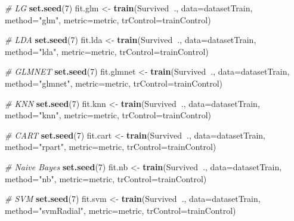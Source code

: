 \documentclass[]{article}
\newenvironment{Shaded}{\begin{snugshade}}{\end{snugshade}}
\newcommand{\KeywordTok}[1]{\textcolor[rgb]{0.13,0.29,0.53}{\textbf{#1}}}
\newcommand{\DataTypeTok}[1]{\textcolor[rgb]{0.13,0.29,0.53}{#1}}
\newcommand{\DecValTok}[1]{\textcolor[rgb]{0.00,0.00,0.81}{#1}}
\newcommand{\StringTok}[1]{\textcolor[rgb]{0.31,0.60,0.02}{#1}}
\newcommand{\CommentTok}[1]{\textcolor[rgb]{0.56,0.35,0.01}{\textit{#1}}}
\newcommand{\OperatorTok}[1]{\textcolor[rgb]{0.81,0.36,0.00}{\textbf{#1}}}
\newcommand{\NormalTok}[1]{#1}
\begin{document}
\begin{Shaded}
\begin{Highlighting}[]
\CommentTok{# LG}
\KeywordTok{set.seed}\NormalTok{(}\DecValTok{7}\NormalTok{)}
\NormalTok{fit.glm <-}\StringTok{ }\KeywordTok{train}\NormalTok{(Survived}\OperatorTok{~}\NormalTok{., }\DataTypeTok{data=}\NormalTok{datasetTrain, }\DataTypeTok{method=}\StringTok{"glm"}\NormalTok{, }\DataTypeTok{metric=}\NormalTok{metric, }
                 \DataTypeTok{trControl=}\NormalTok{trainControl)}

\CommentTok{# LDA}
\KeywordTok{set.seed}\NormalTok{(}\DecValTok{7}\NormalTok{)}
\NormalTok{fit.lda <-}\StringTok{ }\KeywordTok{train}\NormalTok{(Survived}\OperatorTok{~}\NormalTok{., }\DataTypeTok{data=}\NormalTok{datasetTrain, }\DataTypeTok{method=}\StringTok{"lda"}\NormalTok{, }\DataTypeTok{metric=}\NormalTok{metric, }
                 \DataTypeTok{trControl=}\NormalTok{trainControl)}

\CommentTok{# GLMNET}
\KeywordTok{set.seed}\NormalTok{(}\DecValTok{7}\NormalTok{)}
\NormalTok{fit.glmnet <-}\StringTok{ }\KeywordTok{train}\NormalTok{(Survived}\OperatorTok{~}\NormalTok{., }\DataTypeTok{data=}\NormalTok{datasetTrain, }\DataTypeTok{method=}\StringTok{"glmnet"}\NormalTok{, }\DataTypeTok{metric=}\NormalTok{metric,}
                    \DataTypeTok{trControl=}\NormalTok{trainControl)}

\CommentTok{# KNN}
\KeywordTok{set.seed}\NormalTok{(}\DecValTok{7}\NormalTok{)}
\NormalTok{fit.knn <-}\StringTok{ }\KeywordTok{train}\NormalTok{(Survived}\OperatorTok{~}\NormalTok{., }\DataTypeTok{data=}\NormalTok{datasetTrain, }\DataTypeTok{method=}\StringTok{"knn"}\NormalTok{, }\DataTypeTok{metric=}\NormalTok{metric, }
                 \DataTypeTok{trControl=}\NormalTok{trainControl)}

\CommentTok{# CART}
\KeywordTok{set.seed}\NormalTok{(}\DecValTok{7}\NormalTok{)}
\NormalTok{fit.cart <-}\StringTok{ }\KeywordTok{train}\NormalTok{(Survived}\OperatorTok{~}\NormalTok{., }\DataTypeTok{data=}\NormalTok{datasetTrain, }\DataTypeTok{method=}\StringTok{"rpart"}\NormalTok{, }\DataTypeTok{metric=}\NormalTok{metric,}
                  \DataTypeTok{trControl=}\NormalTok{trainControl)}

\CommentTok{# Naive Bayes}
\KeywordTok{set.seed}\NormalTok{(}\DecValTok{7}\NormalTok{)}
\NormalTok{fit.nb <-}\StringTok{ }\KeywordTok{train}\NormalTok{(Survived}\OperatorTok{~}\NormalTok{., }\DataTypeTok{data=}\NormalTok{datasetTrain, }\DataTypeTok{method=}\StringTok{"nb"}\NormalTok{, }\DataTypeTok{metric=}\NormalTok{metric, }
                \DataTypeTok{trControl=}\NormalTok{trainControl)}

\CommentTok{# SVM}
\KeywordTok{set.seed}\NormalTok{(}\DecValTok{7}\NormalTok{)}
\NormalTok{fit.svm <-}\StringTok{ }\KeywordTok{train}\NormalTok{(Survived}\OperatorTok{~}\NormalTok{., }\DataTypeTok{data=}\NormalTok{datasetTrain, }\DataTypeTok{method=}\StringTok{"svmRadial"}\NormalTok{, }\DataTypeTok{metric=}\NormalTok{metric,}
                 \DataTypeTok{trControl=}\NormalTok{trainControl)}
\end{Highlighting}
\end{Shaded}
\end{document}

